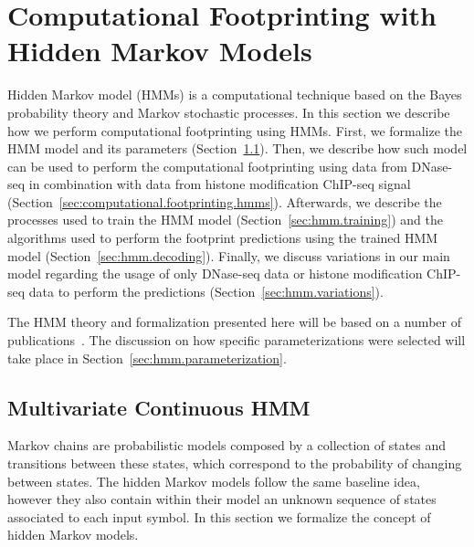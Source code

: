 \section{Computational Footprinting with Hidden Markov Models}
\label{sec:computational.footprinting.hmm}

Hidden Markov model (HMMs) is a computational technique based on the Bayes probability theory and Markov stochastic processes. In this section we describe how we perform computational footprinting using HMMs. First, we formalize the HMM model and its parameters (Section~\ref{sec:multivariate.continuous.hmm}). Then, we describe how such model can be used to perform the computational footprinting using data from DNase-seq in combination with data from histone modification ChIP-seq signal (Section~\ref{sec:computational.footprinting.hmms}). Afterwards, we describe the processes used to train the HMM model (Section~\ref{sec:hmm.training}) and the algorithms used to perform the footprint predictions using the trained HMM model (Section~\ref{sec:hmm.decoding}). Finally, we discuss variations in our main model regarding the usage of only DNase-seq data or histone modification ChIP-seq data to perform the predictions (Section~\ref{sec:hmm.variations}). 

The HMM theory and formalization presented here will be based on a number of publications~\cite{rabiner1989,durbin1998,mitchell1997,bishop2006,duda2000}. The discussion on how specific parameterizations were selected will take place in Section~\ref{sec:hmm.parameterization}. 

\subsection{Multivariate Continuous HMM}
\label{sec:multivariate.continuous.hmm}

Markov chains are probabilistic models composed by a collection of states and transitions between these states, which correspond to the probability of changing between states. The hidden Markov models follow the same baseline idea, however they also contain within their model an unknown sequence of states associated to each input symbol. In this section we formalize the concept of hidden Markov models.

